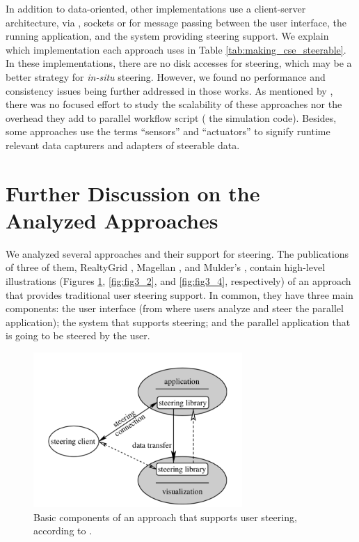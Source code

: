 In addition to data-oriented, other implementations use a client-server
architecture, via , sockets or  for message passing between the
user interface, the running application, and the system providing
steering support. We explain which implementation each approach uses in
Table \ref{tab:making_cse_steerable}. In these implementations, there are no disk accesses for
steering, which may be a better strategy for \emph{in-situ} steering.
However, we found no performance and consistency issues being further
addressed in those works. As mentioned by
\citet{Ayachit2016Performance},
there was no focused effort to study the scalability of these approaches
nor the overhead they add to parallel workflow script (\ie{} the simulation code).
Besides, some approaches \cite{Vetter1999Techniques,Xian2008Computational}
use the terms ``sensors'' and ``actuators'' to signify runtime relevant
data capturers and adapters of steerable data.



\section{Further Discussion on the Analyzed Approaches}

We analyzed several approaches and their support for steering. The publications of three of them, RealtyGrid \cite{Pickles2005practical},
Magellan \cite{Vetter1999Techniques},
and Mulder's \cite{MulderSurvey},
contain high-level illustrations (Figures \ref{fig:fig3_1}, \ref{fig:fig3_2}, and \ref{fig:fig3_4}, respectively) of an approach
that provides traditional user steering support.
In common, they have three main
components: the user interface (from where users analyze and steer the
parallel application); the system that supports steering; and the
parallel application that is going to be steered by the user.

\begin{figure}[H]
    \centering
    \includegraphics[width=300px,keepaspectratio]{img/media/image11.png}
    \caption{Basic components of an approach that supports user steering, according to \citet{Pickles2005practical}.}
    \label{fig:fig3_1}
\end{figure}

